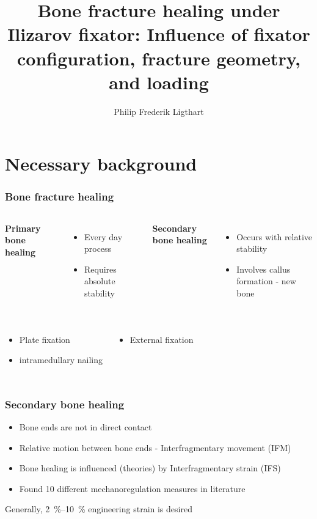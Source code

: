 \documentclass[aspectratio=169,xcolor={svgnames,table},10pt,fleqn]{beamer}
\title[\footnotesize Journal Club]
      {\Large Bone fracture healing under Ilizarov fixator: Influence of fixator configuration, fracture geometry, and loading}
\author{Philip Frederik Ligthart}
\institute{\itshape Dept of Mech \& Mechatronic Eng,\\
           Stellenbosch University, South Africa}
\date{}
\begin{document}
\begin{frame}
  \maketitle
\end{frame}

\section{Necessary background}

  \begin{frame}
    \frametitle{Bone fracture healing}
    \begin{columns}
      \textbf{Primary bone healing}
      \begin{itemize}
        \item Every day process
        \item Requires absolute stability
      \end{itemize}
      \textbf{Secondary bone healing}
      \begin{itemize}
        \item Occurs with relative stability
        \item Involves callus formation - new bone
      \end{itemize}
    \end{columns}
    \vspace{1cm}
    \begin{columns}
      \begin{itemize}
        \item Plate fixation
        \item intramedullary nailing
      \end{itemize}
      \begin{itemize}
        \item External fixation
      \end{itemize}
    \end{columns}
  \end{frame}

  \begin{frame}
    \frametitle{Secondary bone healing}
    \begin{itemize}
      \item Bone ends are not in direct contact
      \item Relative motion between bone ends - Interfragmentary movement (IFM)
      \item Bone healing is influenced (theories) by Interfragmentary strain (IFS)
      \vspace{1cm}
      \item Found 10 different mechanoregulation measures in literature
    \end{itemize}
    \vspace{1cm}
    Generally, \qtyrange[range-phrase = --, range-units = single]{2}{10}{\percent} engineering strain is desired
  \end{frame}
\end{document}
